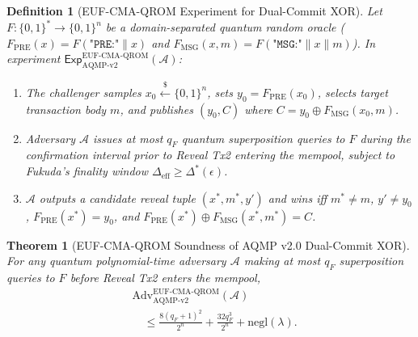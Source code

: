 \documentclass[conference,compsoc]{IEEEtran}
\newtheorem{theorem}{Theorem}
\newtheorem{definition}{Definition}
\begin{document}
\begin{definition}[EUF-CMA-QROM Experiment for Dual-Commit XOR]
Let $F : \{0,1\}^* \to \{0,1\}^n$ be a domain-separated quantum random oracle ($F_{\mathrm{PRE}}(x) = F(\texttt{"PRE:"} \parallel x)$ and $F_{\mathrm{MSG}}(x, m) = F(\texttt{"MSG:"} \parallel x \parallel m)$). In experiment $\mathsf{Exp}^{\mathrm{EUF\text{-}CMA\text{-}QROM}}_{\mathrm{AQMP\text{-}v2}}(\mathcal{A})$:
\begin{enumerate}
    \item The challenger samples $x_0 \xleftarrow{\$} \{0,1\}^n$, sets $y_0 = F_{\mathrm{PRE}}(x_0)$, selects target transaction body $m$, and publishes $(y_0, C)$ where $C = y_0 \oplus F_{\mathrm{MSG}}(x_0, m)$.
    \item Adversary $\mathcal{A}$ issues at most $q_F$ quantum superposition queries to $F$ during the confirmation interval prior to Reveal Tx2 entering the mempool, subject to Fukuda's finality window $\Delta_{\text{eff}} \ge \Delta^*(\epsilon)$.
    \item $\mathcal{A}$ outputs a candidate reveal tuple $(x^*, m^*, y')$ and wins iff $m^* \ne m$, $y' \ne y_0$, $F_{\mathrm{PRE}}(x^*) = y_0$, and $F_{\mathrm{PRE}}(x^*) \oplus F_{\mathrm{MSG}}(x^*, m^*) = C$.
\end{enumerate}
\end{definition}

\begin{theorem}[EUF-CMA-QROM Soundness of AQMP v2.0 Dual-Commit XOR]
For any quantum polynomial-time adversary $\mathcal{A}$ making at most $q_F$ superposition queries to $F$ before Reveal Tx2 enters the mempool,
\begin{equation}
\label{eq:qrom_bound}
\begin{aligned}
&\mathrm{Adv}^{\mathrm{EUF\text{-}CMA\text{-}QROM}}_{\mathrm{AQMP\text{-}v2}}(\mathcal{A}) \\
&\quad \le \frac{8(q_F + 1)^2}{2^n} + \frac{32 q_F^3}{2^n} + \mathrm{negl}(\lambda).
\end{aligned}
\end{equation}
\end{theorem}
\end{document}
